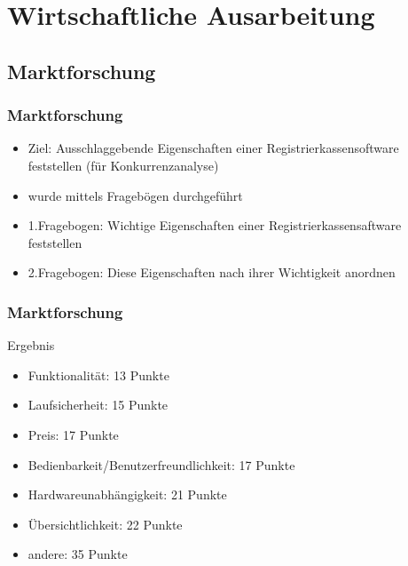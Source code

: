 
\section{Wirtschaftliche Ausarbeitung}
\subsection{Marktforschung}
\begin{frame}
\frametitle{Marktforschung}
\begin{itemize}
\item Ziel: Ausschlaggebende Eigenschaften einer Registrierkassensoftware feststellen (für Konkurrenzanalyse)
\item wurde mittels Fragebögen durchgeführt
\item 1.Fragebogen: Wichtige Eigenschaften einer Registrierkassensaftware feststellen
\item 2.Fragebogen: Diese Eigenschaften nach ihrer Wichtigkeit anordnen
\end{itemize}
\end{frame}
\begin{frame}
\frametitle{Marktforschung}
Ergebnis
\begin{itemize}
\item Funktionalität: 13 Punkte
\item Laufsicherheit: 15 Punkte
\item Preis: 17 Punkte
\item Bedienbarkeit/Benutzerfreundlichkeit: 17 Punkte
\item Hardwareunabhängigkeit: 21 Punkte
\item Übersichtlichkeit: 22 Punkte
\item andere: 35 Punkte
\end{itemize}
\end{frame}
